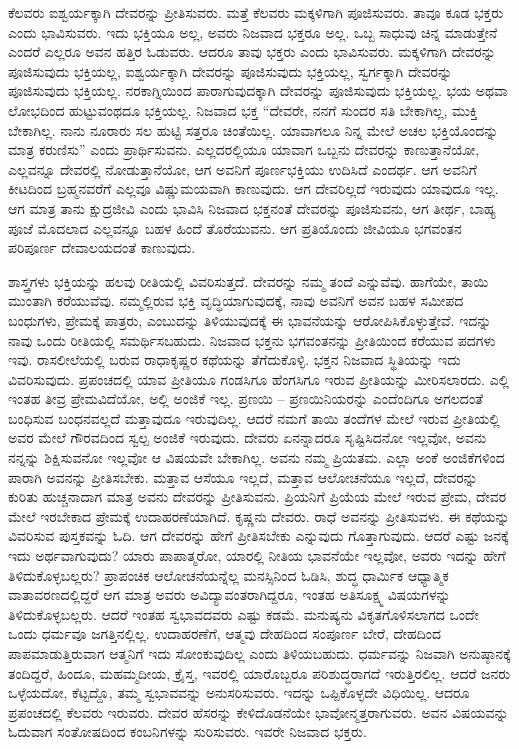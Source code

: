 ಕೆಲವರು ಐಶ್ವರ್ಯಕ್ಕಾಗಿ ದೇವರನ್ನು ಪ್ರೀತಿಸುವರು. ಮತ್ತೆ ಕೆಲವರು ಮಕ್ಕಳಿಗಾಗಿ ಪೂಜಿಸುವರು. ತಾವೂ ಕೂಡ ಭಕ್ತರು ಎಂದು ಭಾವಿಸುವರು. ಇದು ಭಕ್ತಿಯೂ ಅಲ್ಲ, ಅವರು ನಿಜವಾದ ಭಕ್ತರೂ ಅಲ್ಲ. ಒಬ್ಬ ಸಾಧುವು ಚಿನ್ನ ಮಾಡುತ್ತೇನೆ ಎಂದರೆ ಎಲ್ಲರೂ ಅವನ ಹತ್ತಿರ ಓಡುವರು. ಆದರೂ ತಾವು ಭಕ್ತರು ಎಂದು ಭಾವಿಸುವರು. ಮಕ್ಕಳಿಗಾಗಿ ದೇವರನ್ನು ಪೂಜಿಸುವುದು ಭಕ್ತಿಯಲ್ಲ, ಐಶ್ವರ್ಯಕ್ಕಾಗಿ ದೇವರನ್ನು ಪೂಜಿಸುವುದು ಭಕ್ತಿಯಲ್ಲ, ಸ್ವರ್ಗಕ್ಕಾಗಿ ದೇವರನ್ನು ಪೂಜಿಸುವುದು ಭಕ್ತಿಯಲ್ಲ. ನರಕಾಗ್ನಿಯಿಂದ ಪಾರಾಗುವುದಕ್ಕಾಗಿ ದೇವರನ್ನು ಪೂಜಿಸುವುದು ಭಕ್ತಿಯಲ್ಲ. ಭಯ ಅಥವಾ ಲೋಭದಿಂದ ಹುಟ್ಟುವಂಥದೂ ಭಕ್ತಿಯಲ್ಲ. ನಿಜವಾದ ಭಕ್ತ “ದೇವರೇ, ನನಗೆ ಸುಂದರ ಸತಿ ಬೇಕಾಗಿಲ್ಲ, ಮುಕ್ತಿ ಬೇಕಾಗಿಲ್ಲ. ನಾನು ನೂರಾರು ಸಲ ಹುಟ್ಟಿ ಸತ್ತರೂ ಚಿಂತೆಯಿಲ್ಲ. ಯಾವಾಗಲೂ ನಿನ್ನ ಮೇಲೆ ಅಚಲ ಭಕ್ತಿಯೊಂದನ್ನು ಮಾತ್ರ ಕರುಣಿಸು” ಎಂದು ಪ್ರಾರ್ಥಿಸುವನು. ಎಲ್ಲದರಲ್ಲಿಯೂ ಯಾವಾಗ ಒಬ್ಬನು ದೇವರನ್ನು ಕಾಣುತ್ತಾನೆಯೋ, ಎಲ್ಲವನ್ನೂ ದೇವರಲ್ಲಿ ನೋಡುತ್ತಾನೆಯೋ, ಆಗ ಅವನಿಗೆ ಪೂರ್ಣಭಕ್ತಿಯು ಉದಿಸಿದೆ ಎಂದರ್ಥ. ಆಗ ಅವನಿಗೆ ಕೀಟದಿಂದ ಬ್ರಹ್ಮನವರೆಗೆ ಎಲ್ಲವೂ ವಿಷ್ಣುಮಯವಾಗಿ ಕಾಣುವುದು. ಆಗ ದೇವರಿಲ್ಲದೆ ಇರುವುದು ಯಾವುದೂ ಇಲ್ಲ. ಆಗ ಮಾತ್ರ ತಾನು ಕ್ಷುದ್ರಜೀವಿ ಎಂದು ಭಾವಿಸಿ ನಿಜವಾದ ಭಕ್ತನಂತೆ ದೇವರನ್ನು ಪೂಜಿಸುವನು, ಆಗ ತೀರ್ಥ, ಬಾಹ್ಯ ಪೂಜೆ ಮೊದಲಾದ ಎಲ್ಲವನ್ನೂ ಬಹಳ ಹಿಂದೆ ತೊರೆಯುವನು. ಆಗ ಪ್ರತಿಯೊಂದು ಜೀವಿಯೂ ಭಗವಂತನ ಪರಿಪೂರ್ಣ ದೇವಾಲಯದಂತೆ ಕಾಣುವುದು.

\vskip 0.2cm

ಶಾಸ್ತ್ರಗಳು ಭಕ್ತಿಯನ್ನು ಹಲವು ರೀತಿಯಲ್ಲಿ ವಿವರಿಸುತ್ತದೆ. ದೇವರನ್ನು ನಮ್ಮ ತಂದೆ ಎನ್ನುವೆವು. ಹಾಗೆಯೇ, ತಾಯಿ ಮುಂತಾಗಿ ಕರೆಯುವೆವು. ನಮ್ಮಲ್ಲಿರುವ ಭಕ್ತಿ ವೃದ್ಧಿಯಾಗುವುದಕ್ಕೆ, ನಾವು ಅವನಿಗೆ ಅವನ ಬಹಳ ಸಮೀಪದ ಬಂಧುಗಳು, ಪ್ರೇಮಕ್ಕೆ ಪಾತ್ರರು, ಎಂಬುದನ್ನು ತಿಳಿಯುವುದಕ್ಕೆ ಈ ಭಾವನೆಯನ್ನು ಆರೋಪಿಸಿಕೊಳ್ಳುತ್ತೇವೆ. ಇದನ್ನು ನಾವು ಒಂದು ರೀತಿಯಲ್ಲಿ ಸಮರ್ಥಿಸಬಹುದು. ನಿಜವಾದ ಭಕ್ತನು ಭಗವಂತನನ್ನು ಪ್ರೀತಿಯಿಂದ ಕರೆಯುವ ಪದಗಳು ಇವು. ರಾಸಲೀಲೆಯಲ್ಲಿ ಬರುವ ರಾಧಾಕೃಷ್ಣರ ಕಥೆಯನ್ನು ತೆಗೆದುಕೊಳ್ಳಿ. ಭಕ್ತನ ನಿಜವಾದ ಸ್ಥಿತಿಯನ್ನು ಇದು ವಿವರಿಸುವುದು. ಪ್ರಪಂಚದಲ್ಲಿ ಯಾವ ಪ್ರೀತಿಯೂ ಗಂಡಸಿಗೂ ಹೆಂಗಸಿಗೂ ಇರುವ ಪ್ರೀತಿಯನ್ನು ಮೀರಿಸಲಾರದು. ಎಲ್ಲಿ ಇಂತಹ ತೀವ್ರ ಪ್ರೇಮವಿದೆಯೋ, ಅಲ್ಲಿ ಅಂಜಿಕೆ ಇಲ್ಲ. ಪ್ರಣಯಿ – ಪ್ರಣಯಿನಿಯರನ್ನು ಎಂದೆಂದಿಗೂ ಅಗಲದಂತೆ ಬಂಧಿಸುವ ಬಂಧನವಲ್ಲದೆ ಮತ್ತಾವುದೂ ಇರುವುದಿಲ್ಲ. ಆದರೆ ನಮಗೆ ತಾಯಿ ತಂದೆಗಳ ಮೇಲೆ ಇರುವ ಪ್ರೀತಿಯಲ್ಲಿ ಅವರ ಮೇಲೆ ಗೌರವದಿಂದ ಸ್ವಲ್ಪ ಅಂಜಿಕೆ ಇರುವುದು. ದೇವರು ಏನನ್ನಾದರೂ ಸೃಷ್ಟಿಸಿದನೋ ಇಲ್ಲವೋ, ಅವನು ನನ್ನನ್ನು ಶಿಕ್ಷಿಸುವನೋ ಇಲ್ಲವೋ ಆ ವಿಷಯವೇ ಬೇಕಾಗಿಲ್ಲ. ಅವನು ನಮ್ಮ ಪ್ರಿಯತಮ. ಎಲ್ಲಾ ಅಂಕೆ ಅಂಜಿಕೆಗಳಿಂದ ಪಾರಾಗಿ ಅವನನ್ನು ಪ್ರೀತಿಸಬೇಕು. ಮತ್ತಾವ ಆಸೆಯೂ ಇಲ್ಲದೆ, ಮತ್ತಾವ ಆಲೋಚನೆಯೂ ಇಲ್ಲದೆ, ದೇವರನ್ನು ಕುರಿತು ಹುಚ್ಚನಾದಾಗ ಮಾತ್ರ ಅವನು ದೇವರನ್ನು ಪ್ರೀತಿಸುವನು. ಪ್ರಿಯನಿಗೆ ಪ್ರಿಯೆಯ ಮೇಲೆ ಇರುವ ಪ್ರೇಮ, ದೇವರ ಮೇಲೆ ಇರಬೇಕಾದ ಪ್ರೇಮಕ್ಕೆ ಉದಾಹರಣೆಯಾಗಿದೆ. ಕೃಷ್ಣನು ದೇವರು. ರಾಧೆ ಅವನನ್ನು ಪ್ರೀತಿಸುವಳು. ಈ ಕಥೆಯನ್ನು ವಿವರಿಸುವ ಪುಸ್ತಕವನ್ನು ಓದಿ. ಆಗ ದೇವರನ್ನು ಹೇಗೆ ಪ್ರೀತಿಸಬೇಕು ಎನ್ನುವುದು ಗೊತ್ತಾಗುವುದು. ಆದರೆ ಎಷ್ಟು ಜನಕ್ಕೆ ಇದು ಅರ್ಥವಾಗುವುದು? ಯಾರು ಪಾಪಾತ್ಮರೋ, ಯಾರಲ್ಲಿ ನೀತಿಯ ಭಾವನೆಯೇ ಇಲ್ಲವೋ, ಅವರು ಇದನ್ನು ಹೇಗೆ ತಿಳಿದುಕೊಳ್ಳಬಲ್ಲರು? ಪ್ರಾಪಂಚಿಕ ಆಲೋಚನೆಯನ್ನೆಲ್ಲ ಮನಸ್ಸಿನಿಂದ ಓಡಿಸಿ, ಶುದ್ಧ ಧಾರ್ಮಿಕ ಆಧ್ಯಾತ್ಮಿಕ ವಾತಾವರಣದಲ್ಲಿದ್ದರೆ ಆಗ ಮಾತ್ರ ಅವರು ಅವಿದ್ಯಾವಂತರಾಗಿದ್ದರೂ, ಇಂತಹ ಅತಿಸೂಕ್ಷ್ಮ ವಿಷಯಗಳನ್ನು ತಿಳಿದುಕೊಳ್ಳಬಲ್ಲರು. ಆದರೆ ಇಂತಹ ಸ್ವಭಾವದವರು ಎಷ್ಟು ಕಡಮೆ. ಮನುಷ್ಯನು ವಿಕೃತಗೊಳಿಸಲಾಗದ ಒಂದೇ ಒಂದು ಧರ್ಮವೂ ಜಗತ್ತಿನಲ್ಲಿಲ್ಲ. ಉದಾಹರಣೆಗೆ, ಆತ್ಮವು ದೇಹದಿಂದ ಸಂಪೂರ್ಣ ಬೇರೆ, ದೇಹದಿಂದ ಪಾಪಮಾಡುತ್ತಿರುವಾಗ ಆತ್ಮನಿಗೆ ಇದು ಸೋಂಕುವುದಿಲ್ಲ ಎಂದು ತಿಳಿಯಬಹುದು. ಧರ್ಮವನ್ನು ನಿಜವಾಗಿ ಅನುಷ್ಠಾನಕ್ಕೆ ತಂದಿದ್ದರೆ, ಹಿಂದೂ, ಮಹಮ್ಮದೀಯ, ಕ್ರೈಸ್ತ, ಇವರಲ್ಲಿ ಯಾರೊಬ್ಬರೂ ಪರಿಶುದ್ಧರಾಗದೆ ಇರುತ್ತಿರಲಿಲ್ಲ. ಆದರೆ ಜನರು ಒಳ್ಳೆಯದೋ, ಕೆಟ್ಟದ್ದೊ, ತಮ್ಮ ಸ್ವಭಾವವನ್ನು ಅನುಸರಿಸುವರು. ಇದನ್ನು ಒಪ್ಪಿಕೊಳ್ಳದೇ ವಿಧಿಯಿಲ್ಲ. ಆದರೂ ಪ್ರಪಂಚದಲ್ಲಿ ಕೆಲವರು ಇರುವರು. ದೇವರ ಹೆಸರನ್ನು ಕೇಳಿದೊಡನೆಯೇ ಭಾವೋನ್ಮತ್ತರಾಗುವರು. ಅವನ ವಿಷಯವನ್ನು ಓದುವಾಗ ಸಂತೋಷದಿಂದ ಕಂಬನಿಗಳನ್ನು ಸುರಿಸುವರು. ಇವರೇ ನಿಜವಾದ ಭಕ್ತರು.

